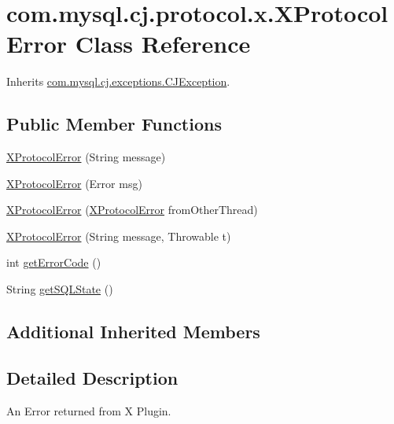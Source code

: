 \hypertarget{classcom_1_1mysql_1_1cj_1_1protocol_1_1x_1_1_x_protocol_error}{}\section{com.\+mysql.\+cj.\+protocol.\+x.\+X\+Protocol\+Error Class Reference}
\label{classcom_1_1mysql_1_1cj_1_1protocol_1_1x_1_1_x_protocol_error}


Inherits \mbox{\hyperlink{classcom_1_1mysql_1_1cj_1_1exceptions_1_1_c_j_exception}{com.\+mysql.\+cj.\+exceptions.\+C\+J\+Exception}}.

\subsection*{Public Member Functions}
\begin{DoxyCompactItemize}
\item 
\mbox{\hyperlink{classcom_1_1mysql_1_1cj_1_1protocol_1_1x_1_1_x_protocol_error_a6a94dd1bcf4c6d2796ef140c615dcaec}{X\+Protocol\+Error}} (String message)
\item 
\mbox{\hyperlink{classcom_1_1mysql_1_1cj_1_1protocol_1_1x_1_1_x_protocol_error_a3bca6e42191ea9e9a0b983355bda021a}{X\+Protocol\+Error}} (Error msg)
\item 
\mbox{\hyperlink{classcom_1_1mysql_1_1cj_1_1protocol_1_1x_1_1_x_protocol_error_aeabd60ded1eb305b92aee8e080d72fbc}{X\+Protocol\+Error}} (\mbox{\hyperlink{classcom_1_1mysql_1_1cj_1_1protocol_1_1x_1_1_x_protocol_error}{X\+Protocol\+Error}} from\+Other\+Thread)
\item 
\mbox{\hyperlink{classcom_1_1mysql_1_1cj_1_1protocol_1_1x_1_1_x_protocol_error_ac4646bf4e168d9f7771831a34d0cc7e8}{X\+Protocol\+Error}} (String message, Throwable t)
\item 
int \mbox{\hyperlink{classcom_1_1mysql_1_1cj_1_1protocol_1_1x_1_1_x_protocol_error_a04bb16e710d0137a5290294a1590761b}{get\+Error\+Code}} ()
\item 
String \mbox{\hyperlink{classcom_1_1mysql_1_1cj_1_1protocol_1_1x_1_1_x_protocol_error_acdfdb965cbedd939659a20d73c525ccf}{get\+S\+Q\+L\+State}} ()
\end{DoxyCompactItemize}
\subsection*{Additional Inherited Members}


\subsection{Detailed Description}
An Error returned from X Plugin. 

